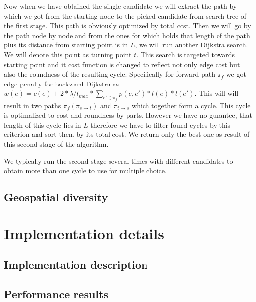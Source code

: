 \documentclass{ctuthesis}
\begin{document}
Now when we have obtained the single candidate we will extract the path by which we got from the starting node to the picked candidate from search tree of the first stage. This path is obviously optimized by total cost. Then we will go by the path node by node and from the ones for which holds that length of the path plus its distance from starting point is in \(L\), we will run another Dijkstra search. We will denote this point as turning point \(t\). This search is targeted towards starting point and it cost function is changed to reflect not only edge cost but also the roundness of the resulting cycle. Specifically for forward path \(\pi_f\) we got edge penalty for backward Dijkstra as \(w(e) = c(e) + 2*\lambda / l_{max} * \sum_{e' \in \pi_f}{p(e, e')*l(e)*l(e')}\). This will will result in two paths \(\pi_f (\pi_{s \rightarrow t})\) and \(\pi_{t \rightarrow s}\) which together form a cycle. This cycle is optimalized to cost and roundness by parts. However we have no gurantee, that length of this cycle lies in \(L\) therefore we have to filter found cycles by this criterion and sort them by its total cost. We return only the best one as result of this second stage of the algorithm.\par
We typically run the second stage several times with different candidates to obtain more than one cycle to use for multiple choice.


\section{Geospatial diversity}


\chapter{Implementation details}

\section{Implementation description}

\section{Performance results}
\end{document}
